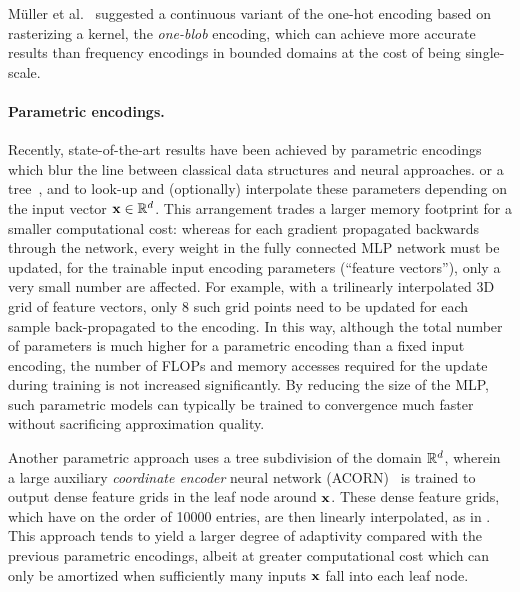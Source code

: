 \documentclass[acmtog,authorversion]{acmart}
\begin{document}
M\"uller et al.~ suggested a continuous variant of the one-hot encoding based on rasterizing a kernel, the \emph{one-blob} encoding, which can achieve more accurate results than frequency encodings in bounded domains at the cost of being single-scale.

\paragraph{Parametric encodings.}
Recently, state-of-the-art results have been achieved by parametric encodings which blur the line between classical data structures and neural approaches.
 or a tree~\cite{takikawa2021nglod}, and to look-up and (optionally) interpolate these parameters depending on the input vector ${\mathbf{x} \in \mathbb{R}^d}$. This arrangement trades a larger memory footprint for a smaller computational cost: whereas for each gradient propagated backwards through the network, every weight in the fully connected MLP network must be updated, for the trainable input encoding parameters (``feature vectors''), only a very small number are affected. For example, with a trilinearly interpolated 3D grid of feature vectors, only 8 such grid points need to be updated for each sample back-propagated to the encoding. In this way, although the total number of parameters is much higher for a parametric encoding than a fixed input encoding, the number of FLOPs and memory accesses required for the update during training is not increased significantly. By reducing the size of the MLP, such parametric models can typically be trained to convergence much faster without sacrificing approximation quality.

Another parametric approach uses a tree subdivision of the domain $\mathbb{R}^d$, wherein a large auxiliary \emph{coordinate encoder} neural network (ACORN)~\citep{martel2021acorn} is trained to output dense feature grids in the leaf node around $\mathbf{x}$.
These dense feature grids, which have on the order of \num{10000} entries, are then linearly interpolated, as in \citet{liu2020neural}.
This approach tends to yield a larger degree of adaptivity compared with the previous parametric encodings, albeit at greater computational cost which can only be amortized when sufficiently many inputs $\mathbf{x}$ fall into each leaf node.
\end{document}
